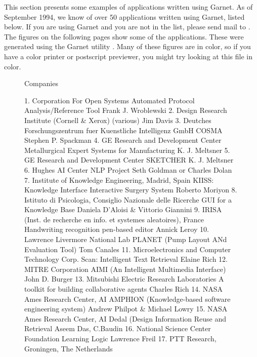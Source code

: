 This section presents some examples of applications written using
Garnet.  As of September 1994, we know of over 50 applications
written using Garnet, listed below.  If you
are using Garnet and you are not in the list, please send mail to
.  The figures on the following pages show some
of the applications.  These were generated using the Garnet utility
.  Many of these figures are in color, so if you
have a color printer or postscript previewer, you might try looking at
this file in color.
\begin{figure}
\begin{figcol}
\begin{b}
Companies
\end{b}
1. Corporation For Open Systems
     Automated Protocol Analysis/Reference Tool
     Frank J. Wroblewski
2. Design Research Institute (Cornell \& Xerox)
     (various)
     Jim Davis
3. Deutches Forschungszentrum fuer Kuenstliche
        Intelligenz GmbH
     COSMA
     Stephen P. Spackman
4. GE Research and Development Center
     Metallurgical Expert Systems for Manufacturing
     K. J. Meltsner
5. GE Research and Development Center
     SKETCHER
     K. J. Meltsner
6. Hughes AI Center
     NLP Project
     Seth Goldman or Charles Dolan
7. Institute of Knowledge Engineering, Madrid, Spain
     KIISS: Knowledge Interface Interactive
        Surgery System
     Roberto Moriyon
8. Istituto di Psicologia, Consiglio Nazionale
        delle Ricerche
     GUI for a Knowledge Base
     Daniela D'Aloisi \& Vittorio Giannini
9. IRISA (Inst. de recherche en info. et systemes
        aleatoires), France
      Handwriting recognition pen-based editor
      Annick Leroy
10. Lawrence Livermore National Lab
      PLANET (Pump Layout ANd Evaluation Tool)
      Tom Canales
11. Microelectronics and Computer Technology Corp.
      Scan: Intelligent Text Retrieval
      Elaine Rich
12. MITRE Corporation
      AIMI (An Intelligent Multimedia Interface)
      John D. Burger
13. Mitsubishi Electric Research Laboratories
      A toolkit for building collaborative agents
      Charles Rich
14. NASA Ames Research Center, AI
      AMPHION (Knowledge-based software
         engineering system)
      Andrew Philpot \& Michael Lowry
15. NASA Ames Research Center, AI
      Dedal (Design Information Reuse and Retrieval
      Aseem Das, C.Baudin
16. National Science Center Foundation
      Learning Logic
      Lawrence Freil
17. PTT Research, Groningen, The Netherlands

\end{figcol}
\end{figure}
